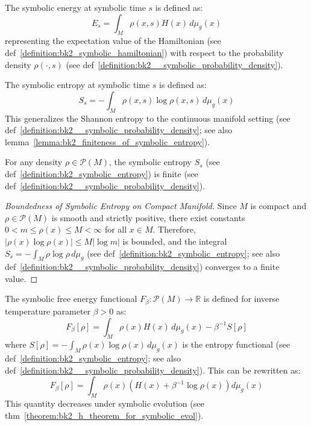 \begin{definition} 
\label{definition:bk2_symbolic_energy} 
The symbolic energy at symbolic time $s$ is defined as:
\[
E_s = \int_M \rho(x,s) H(x) \, d\mu_g(x)
\]
representing the expectation value of the Hamiltonian (see def~\ref{definition:bk2_symbolic_hamiltonian}) with respect to the probability density $\rho(\cdot,s)$ (see def~\ref{definition:bk2__symbolic_probability_density}).
\end{definition}

\begin{definition} 
\label{definition:bk2_symbolic_entropy} 
The symbolic entropy at symbolic time $s$ is defined as:
\[
S_s = -\int_M \rho(x,s) \log\rho(x,s) \, d\mu_g(x)
\]
This generalizes the Shannon entropy to the continuous manifold setting (see def~\ref{definition:bk2__symbolic_probability_density}; see also lemma~\ref{lemma:bk2_finiteness_of_symbolic_entropy}).
\end{definition}

\begin{lemma} 
\label{lemma:bk2_finiteness_of_symbolic_entropy} 
For any density $\rho \in \mathcal{P}(M)$, the symbolic entropy $S_s$ (see def~\ref{definition:bk2_symbolic_entropy}) is finite (see def~\ref{definition:bk2__symbolic_probability_density}).
\end{lemma}

\begin{proof}[Boundedness of Symbolic Entropy on Compact Manifold]
\label{proof:bk2_bounded_symbolic_entropy}
Since $M$ is compact and $\rho \in \mathcal{P}(M)$ is smooth and strictly positive, there exist constants $0 < m \leq \rho(x) \leq M < \infty$ for all $x \in M$. Therefore, $|\rho(x) \log\rho(x)| \leq M|\log m|$ is bounded, and the integral $S_s = -\int_M \rho \log\rho \, d\mu_g$ (see def~\ref{definition:bk2_symbolic_entropy}; see also def~\ref{definition:bk2__symbolic_probability_density}) converges to a finite value.
\end{proof}

\begin{definition} 
\label{definition:bk2_symbolic_free_energy} 
The symbolic free energy functional $F_\beta: \mathcal{P}(M) \rightarrow \mathbb{R}$ is defined for inverse temperature parameter $\beta > 0$ as:
\[
F_\beta[\rho] = \int_M \rho(x) H(x) \, d\mu_g(x) - \beta^{-1} S[\rho]
\]
where $S[\rho] = -\int_M \rho(x) \log\rho(x) \, d\mu_g(x)$ is the entropy functional (see def~\ref{definition:bk2_symbolic_entropy}; see also def~\ref{definition:bk2__symbolic_probability_density}). This can be rewritten as:
\[
F_\beta[\rho] = \int_M \rho(x) \left(H(x) + \beta^{-1}\log\rho(x)\right) d\mu_g(x)
\]
This quantity decreases under symbolic evolution (see thm~\ref{theorem:bk2_h_theorem_for_symbolic_evol}).
\end{definition}

